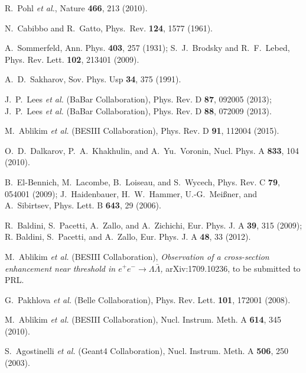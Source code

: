 \begin{thebibliography}{99}

R.~Pohl {\it et al.}, Nature {\bf 466}, 213 (2010).

N.~Cabibbo and R.~Gatto, Phys.~Rev. {\bf 124}, 1577 (1961).

A.~Sommerfeld,  Ann. Phys. {\bf 403}, 257 (1931);
S.~J.~Brodsky and R.~F.~Lebed, Phys. Rev. Lett. {\bf 102}, 213401 (2009).

A.~D.~Sakharov, Sov. Phys. Usp {\bf 34}, 375 (1991).

J.~P.~Lees {\it et al.} (BaBar Collaboration), Phys. Rev. D {\bf 87}, 092005 (2013);
J.~P.~Lees {\it et al.} (BaBar Collaboration), Phys. Rev. D {\bf 88}, 072009 (2013).

M.~Ablikim {\it et al.} (BESIII Collaboration), Phys. Rev. D {\bf 91}, 112004 (2015).

O.~D.~Dalkarov, P.~A.~Khakhulin, and A.~Yu.~Voronin, Nucl. Phys. A {\bf 833}, 104 (2010).

B.~El-Bennich, M.~Lacombe, B.~Loiseau, and S.~Wycech, Phys. Rev. C {\bf 79}, 054001 (2009);
J.~Haidenbauer, H.~W.~Hammer, U.-G.~Mei\ss{}ner, and A.~Sibirtsev, Phys. Lett. B {\bf 643}, 29 (2006).

R.~Baldini, S.~Pacetti, A.~Zallo, and A.~Zichichi, Eur. Phys. J. A {\bf 39}, 315 (2009); R. Baldini, S.~Pacetti, and A.~Zallo, Eur. Phys. J. A {\bf 48}, 33 (2012).

M.~Ablikim {\it et al.} (BESIII Collaboration), \emph{Observation of a
cross-section enhancement near threshold in $e^+e^- \to \Lambda \bar{\Lambda}$,} arXiv:1709.10236, to be submitted to PRL.

G.~Pakhlova {\it et al.} (Belle Collaboration), Phys. Rev. Lett. {\bf 101}, 172001 (2008).

M.~Ablikim {\it et al.} (BESIII Collaboration), Nucl. Instrum. Meth. A {\bf 614}, 345 (2010).

S.~Agostinelli {\it et al.} ({\sc Geant4} Collaboration), Nucl. Instrum. Meth. A {\bf 506}, 250 (2003).


\end{thebibliography}
